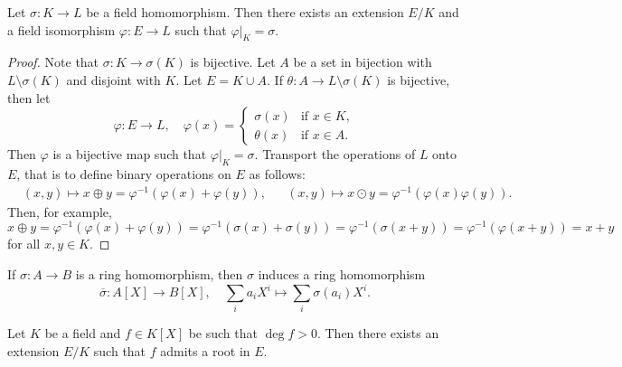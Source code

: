 
\begin{lemma}
\label{lem:exists_bijective}
	Let $\sigma\colon K\to L$ be a field homomorphism. Then there exists an extension
	$E/K$ and a field isomorphism $\varphi\colon E\to L$
	such that $\varphi|_K=\sigma$. 
\end{lemma}

\begin{proof}
    Note that $\sigma\colon K\to\sigma(K)$ is bijective. 
    Let $A$ be a set in bijection with $L\setminus\sigma(K)$ and disjoint with $K$. 
	Let $E=K\cup A$. If $\theta\colon A\to L\setminus\sigma(K)$ is bijective, then 
	let 
	\[
		\varphi\colon E\to L,
		\quad
		\varphi(x)=\begin{cases}
			\sigma(x) & \text{if $x\in K$},\\
			\theta(x) & \text{if $x\in A$}.
		\end{cases}
	\]
	Then $\varphi$ is a bijective map such that $\varphi|_K=\sigma$. 
	Transport the operations of $L$ onto $E$, that is 
	to define binary operations on $E$ as follows: 
	\begin{align*}
		&(x,y)\mapsto x\oplus y=\varphi^{-1}(\varphi(x)+\varphi(y)), && 
		(x,y)\mapsto x\odot y=\varphi^{-1}(\varphi(x)\varphi(y)).
	\end{align*}
	Then, for example, 
	\[
		x\oplus y=\varphi^{-1}(\varphi(x)+\varphi(y))=\varphi^{-1}(\sigma(x)+\sigma(y))
		=\varphi^{-1}(\sigma(x+y))=\varphi^{-1}(\varphi(x+y))=x+y
	\]
	for all $x,y\in K$. 
\end{proof}

If $\sigma\colon A\to B$ is a ring homomorphism, then $\sigma$ induces a ring
homomorphism 
\[
\overline{\sigma}\colon A[X]\to B[X],\quad 
\sum_ia_iX^i\mapsto\sum_i\sigma(a_i)X^i.
\]

\begin{theorem}
	Let $K$ be a field and $f\in K[X]$ be such that $\deg f>0$. Then 
	there exists an extension $E/K$ such that $f$ admits a root in $E$. 
\end{theorem}

